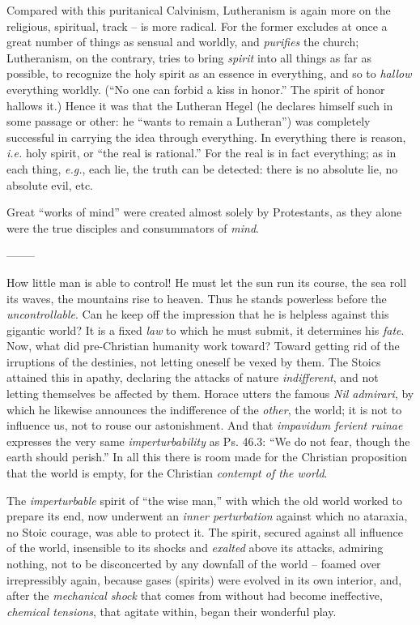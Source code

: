 \documentclass[12pt,a4paper]{book}
\begin{document}
Compared with this puritanical Calvinism, Lutheranism is again more on the 
religious, spiritual, track -- is more radical. For the former excludes at 
once a great number of things as sensual and worldly, and \textit{purifies} 
the church; Lutheranism, on the contrary, tries to bring \textit{spirit} into 
all things as far as possible, to recognize the holy spirit as an essence in 
everything, and so to \textit{hallow} everything worldly. (``No one can 
forbid a kiss in honor.'' The spirit of honor hallows it.) Hence it was that 
the Lutheran Hegel (he declares himself such in some passage or other: he 
``wants to remain a Lutheran'') was completely successful in carrying the 
idea through everything. In everything there is reason, \textit{i.e.} holy 
spirit, or ``the real is rational.'' For the real is in fact everything; as 
in each thing, \textit{e.g.}, each lie, the truth can be detected: there is 
no absolute lie, no absolute evil, etc.

Great ``works of mind'' were created almost solely by Protestants, as they 
alone were the true disciples and consummators of \textit{mind}.

\begin{center}
--------\end{center}


How little man is able to control! He must let the sun run its course, the sea 
roll its waves, the mountains rise to heaven. Thus he stands powerless before 
the \textit{uncontrollable}. Can he keep off the impression that he is 
helpless against this gigantic world? It is a fixed \textit{law} to which he 
must submit, it determines his \textit{fate}. Now, what did pre-Christian 
humanity work toward? Toward getting rid of the irruptions of the destinies, 
not letting oneself be vexed by them. The Stoics attained this in apathy, 
declaring the attacks of nature \textit{indifferent}, and not letting 
themselves be affected by them. Horace utters the famous \textit{Nil 
admirari}, by which he likewise announces the indifference of the 
\textit{other}, the world; it is not to influence us, not to rouse our 
astonishment. And that \textit{impavidum ferient ruinae} expresses the very 
same \textit{imperturbability} as Ps. 46.3: ``We do not fear, though the 
earth should perish.'' In all this there is room made for the Christian 
proposition that the world is empty, for the Christian \textit{contempt of the 
world}.

The \textit{imperturbable} spirit of ``the wise man,'' with which the old 
world worked to prepare its end, now underwent an \textit{inner perturbation} 
against which no ataraxia, no Stoic courage, was able to protect it. The 
spirit, secured against all influence of the world, insensible to its shocks 
and \textit{exalted} above its attacks, admiring nothing, not to be 
disconcerted by any downfall of the world -- foamed over irrepressibly again, 
because gases (spirits) were evolved in its own interior, and, after the 
\textit{mechanical shock} that comes from without had become ineffective, 
\textit{chemical tensions}, that agitate within, began their wonderful play.
\end{document}
